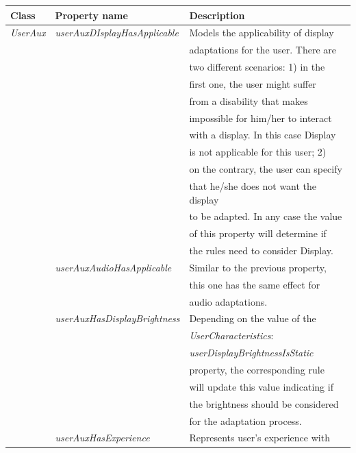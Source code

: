 \begin{center}
\footnotesize
\begin{longtable}{l l l}
  \label{tbl:aux_classes_data_properties} \\
  \hline 
  \textbf{Class} 	& \textbf{Property name} 		& \textbf{Description}			\\
  \hline
  \textit{UserAux}	& \textit{userAuxDIsplayHasApplicable}	& Models the applicability of display 	\\
			& 					& adaptations for the user. There are 	\\
			& 					& two different scenarios: 1) in the 	\\
			& 					& first one, the user might suffer  	\\
			&					& from a disability that makes 		\\
			&					& impossible for him/her to interact 	\\
			&					& with a display. In this case Display 	\\
			& 					& is not applicable for this user; 2)	\\
			& 					& on the contrary, the user can specify	\\
			&					& that he/she does not want the display	\\
			& 					& to be adapted. In any case the value 	\\
			&					& of this property will determine if  	\\	
			& 					& the rules need to consider Display.	\\
			& \textit{userAuxAudioHasApplicable}	& Similar to the previous property, 	\\
			& 					& this one has the same effect for 	\\
			&					& audio adaptations.			\\
			& \textit{userAuxHasDisplayBrightness}	& Depending on the value of the 	\\
			&					& \textit{UserCharacteristics}:		\\
			& 					& \textit{userDisplayBrightnessIsStatic}\\
			&					& property, the corresponding rule 	\\
			& 					& will update this value indicating if 	\\
			& 					& the brightness should be considered 	\\
			&					& for the adaptation process.		\\
			& \textit{userAuxHasExperience}		& Represents user’s experience with 	\\

\end{longtable}
\end{center}
